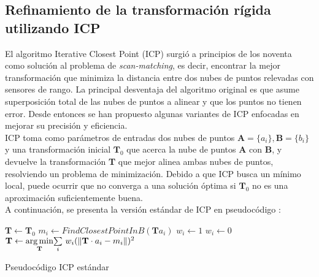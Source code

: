 \subsection{Refinamiento de la transformación rígida utilizando ICP}

El algoritmo Iterative Closest Point (ICP) \cite{Besl92} surgió a principios de los noventa como solución al problema de \textit{scan-matching}, es decir, encontrar la mejor transformación que minimiza la distancia entre dos nubes de puntos relevadas con sensores de rango. La principal desventaja del algoritmo original es que asume superposición total de las nubes de puntos a alinear y que los puntos no tienen error. Desde entonces se han propuesto algunas variantes de ICP enfocadas en mejorar su precisión y eficiencia.\\
ICP toma como parámetros de entradas dos nubes de puntos $\textbf{A} = \{a_{i}\}, \textbf{B} = \{b_{i}\}$ y una transformación inicial $\textbf{T}_{0}$ que acerca la nube de puntos \textbf{A} con \textbf{B}, y devuelve la transformación \textbf{T} que mejor alinea ambas nubes de puntos, resolviendo un problema de minimización. Debido a que ICP busca un mínimo local, puede ocurrir que no converga a una solución óptima si $\textbf{T}_{0}$ no es una aproximación suficientemente buena. \\

A continuación, se presenta la versión estándar de ICP en pseudocódigo :
\begin{algorithm}
\begin{algorithmic}

\STATE $\textbf{T} \leftarrow \textbf{T}_{0}$
\STATE $m_{i} \leftarrow FindClosestPointInB(\textbf{T} a_{i})$
\STATE $w_{i} \leftarrow 1$
\ELSE
\STATE $w_{i} \leftarrow 0$
\ENDIF
\ENDFOR
\STATE $ \textbf{T} \leftarrow \underset{\textbf{T}}{\arg\min}  \underset{i}{\sum}\ w_{i} (\lVert\textbf{T} \cdot a_{i} - m_{i} \rVert)^{2} $
\ENDWHILE

\end{algorithmic}
\caption{Pseudocódigo ICP estándar}
\label{icp-pseudocodigo}
\end{algorithm}

